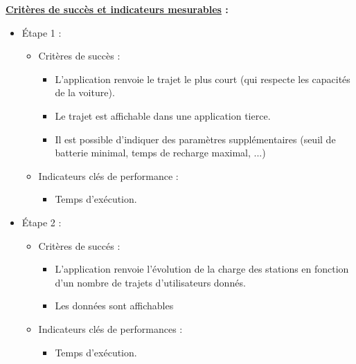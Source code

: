 \documentclass[12pt]{report}
\begin{document}
        \bigskip
        \textbf{\underline{Critères de succès et indicateurs mesurables} :}
        \begin{itemize}
            \item  Étape 1 :
                \begin{itemize}
                    \item Critères de succès :
                        \begin{itemize}
                            \item L'application renvoie le trajet le plus court (qui respecte les capacités de la voiture).
                            \item Le trajet est affichable dans une application tierce.
                            \item Il est possible d'indiquer des paramètres supplémentaires (seuil de batterie minimal, temps de recharge maximal, ...)
                        \end{itemize}
                    \item Indicateurs clés de performance :
                        \begin{itemize}
                            \item Temps d'exécution.
                        \end{itemize}
                \end{itemize}
            \item  Étape 2 :
                \begin{itemize}
                    \item Critères de succés :
                        \begin{itemize}
                            \item L'application renvoie l'évolution de la charge des stations en fonction d'un nombre de trajets d'utilisateurs donnés.
                            \item Les données sont affichables
                        \end{itemize}
                    \item Indicateurs clés de performances :
                        \begin{itemize}
                            \item Temps d'exécution.
                        \end{itemize}
                \end{itemize}
        \end{itemize}
\end{document}
